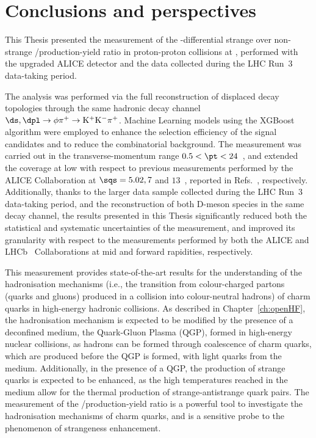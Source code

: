 \chapter{Conclusions and perspectives}\label{ch:conclusions}

This Thesis presented the measurement of the \pt-differential strange over non-strange \ds/\dpl production-yield ratio in proton-proton collisions at \thirteen, performed with the upgraded ALICE detector and the data collected during the LHC Run~3 data-taking period. 

The analysis was performed via the full reconstruction of displaced decay topologies through the same hadronic decay channel $\ds, \dpl \rightarrow \phi\pi^+\rightarrow\mathrm{K^+K^-\pi^+}$. Machine Learning models using the XGBoost algorithm were employed to enhance the selection efficiency of the signal candidates and to reduce the combinatorial background. The measurement was carried out in the transverse-momentum range $0.5<\pt<24$~\gevc, and extended the \pt coverage at low \pt with respect to previous measurements performed by the ALICE Collaboration at $\sqs = 5.02, 7$ and $13$~\tev, reported in Refs.~\cite{ALICE:2021mgk,ALICE:2017olh,ALICE:2023sgl}, respectively. Additionally, thanks to the larger data sample collected during the LHC Run~3 data-taking period, and the reconstruction of both D-meson species in the same decay channel, the results presented in this Thesis significantly reduced both the statistical and systematic uncertainties of the measurement, and improved its granularity with respect to the measurements performed by both the ALICE and LHCb~\cite{LHCb:2015swx} Collaborations at mid and forward rapidities, respectively.

This measurement provides state-of-the-art results for the understanding of the hadronisation mechanisms (i.e., the transition from colour-charged partons (quarks and gluons) produced in a collision into colour-neutral hadrons) of charm quarks in high-energy hadronic collisions. As described in Chapter~\ref{ch:openHF}, the hadronisation mechanism is expected to be modified by the presence of a deconfined medium, the Quark-Gluon Plasma (QGP), formed in high-energy nuclear collisions, as hadrons can be formed through coalescence of charm quarks, which are produced before the QGP is formed, with light quarks from the medium. Additionally, in the presence of a QGP, the production of strange quarks is expected to be enhanced, as the high temperatures reached in the medium allow for the thermal production of strange-antistrange quark pairs. The measurement of the \ds/\dpl production-yield ratio is a powerful tool to investigate the hadronisation mechanisms of charm quarks, and is a sensitive probe to the phenomenon of strangeness enhancement. 

